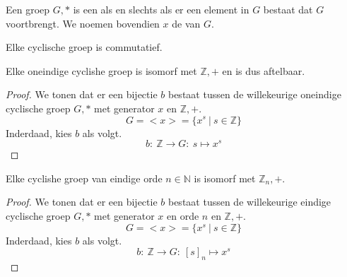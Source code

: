 \documentclass[main.tex]{subfiles}
\begin{document}
\begin{de}
  \label{de:cyclische-groep}
  Een groep $G,*$ is een  als en slechts als er een element in $G$ bestaat dat $G$ voortbrengt.
  We noemen bovendien $x$ de  van $G$.
\end{de}

\begin{st}
  \label{st:cyclishe-groep-is-commutatief}
  Elke cyclische groep is commutatief.
\end{st}

\begin{ei}
  Elke oneindige cyclishe groep is isomorf met $\mathbb{Z},+$ en is dus aftelbaar.

  \begin{proof}
    We tonen dat er een bijectie $b$ bestaat tussen de willekeurige oneindige cyclische groep $G,*$ met generator $x$ en $\mathbb{Z},+$.
    \[ G = <x> = \{ x^{s}\ |\ s \in \mathbb{Z} \} \]
    Inderdaad, kies $b$ als volgt.
    \[ b:\ \mathbb{Z} \rightarrow G:\ s \mapsto x^{s} \]
  \end{proof}
\end{ei}

\begin{ei}
  Elke cyclishe groep van eindige orde $n \in \mathbb{N}$ is isomorf met $\mathbb{Z}_{n},+$.

  \begin{proof}
    We tonen dat er een bijectie $b$ bestaat tussen de willekeurige eindige cyclische groep $G,*$ met generator $x$ en orde $n$ en $\mathbb{Z},+$.
    \[ G = <x> = \{ x^{s}\ |\ s \in \mathbb{Z} \} \]
    Inderdaad, kies $b$ als volgt.
    \[ b:\ \mathbb{Z} \rightarrow G:\ [s]_{n} \mapsto x^{s} \]
  \end{proof}
\end{ei}
\end{document}
